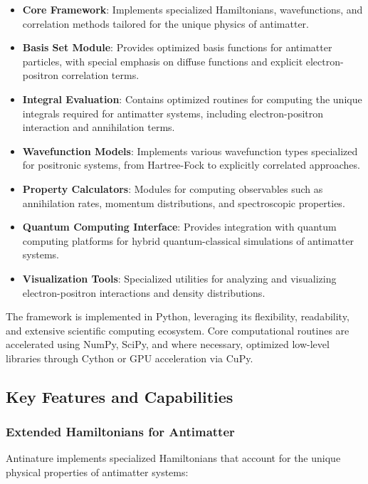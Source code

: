 \documentclass[10pt,twocolumn,a4paper]{article}
\begin{document}
\begin{itemize}
    \item \textbf{Core Framework}: Implements specialized Hamiltonians, wavefunctions, and correlation methods tailored for the unique physics of antimatter.
    
    \item \textbf{Basis Set Module}: Provides optimized basis functions for antimatter particles, with special emphasis on diffuse functions and explicit electron-positron correlation terms.
    
    \item \textbf{Integral Evaluation}: Contains optimized routines for computing the unique integrals required for antimatter systems, including electron-positron interaction and annihilation terms.
    
    \item \textbf{Wavefunction Models}: Implements various wavefunction types specialized for positronic systems, from Hartree-Fock to explicitly correlated approaches.
    
    \item \textbf{Property Calculators}: Modules for computing observables such as annihilation rates, momentum distributions, and spectroscopic properties.
    
    \item \textbf{Quantum Computing Interface}: Provides integration with quantum computing platforms for hybrid quantum-classical simulations of antimatter systems.
    
    \item \textbf{Visualization Tools}: Specialized utilities for analyzing and visualizing electron-positron interactions and density distributions.
\end{itemize}

The framework is implemented in Python, leveraging its flexibility, readability, and extensive scientific computing ecosystem. Core computational routines are accelerated using NumPy, SciPy, and where necessary, optimized low-level libraries through Cython or GPU acceleration via CuPy.

\subsection{Key Features and Capabilities}

\subsubsection{Extended Hamiltonians for Antimatter}
Antinature implements specialized Hamiltonians that account for the unique physical properties of antimatter systems:
\end{document}
